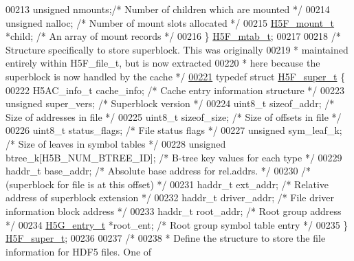 \begin{DoxyCode}
00213     \textcolor{keywordtype}{unsigned}        nmounts;\textcolor{comment}{/* Number of children which are mounted */}
00214     \textcolor{keywordtype}{unsigned}        nalloc; \textcolor{comment}{/* Number of mount slots allocated  */}
00215     \hyperlink{struct_h5_f__mount__t}{H5F\_mount\_t}      *child; \textcolor{comment}{/* An array of mount records        */}
00216 \} \hyperlink{struct_h5_f__mtab__t}{H5F\_mtab\_t};
00217 
00218 \textcolor{comment}{/* Structure specifically to store superblock. This was originally}
00219 \textcolor{comment}{ * maintained entirely within H5F\_file\_t, but is now extracted}
00220 \textcolor{comment}{ * here because the superblock is now handled by the cache */}
\hyperlink{struct_h5_f__super__t}{00221} \textcolor{keyword}{typedef} \textcolor{keyword}{struct }\hyperlink{struct_h5_f__super__t}{H5F\_super\_t} \{
00222     H5AC\_info\_t cache\_info;     \textcolor{comment}{/* Cache entry information structure          */}
00223     \textcolor{keywordtype}{unsigned}    super\_vers;     \textcolor{comment}{/* Superblock version                         */}
00224     uint8\_t sizeof\_addr;    \textcolor{comment}{/* Size of addresses in file                  */}
00225     uint8\_t sizeof\_size;    \textcolor{comment}{/* Size of offsets in file                    */}
00226     uint8\_t     status\_flags;   \textcolor{comment}{/* File status flags                          */}
00227     \textcolor{keywordtype}{unsigned}    sym\_leaf\_k;     \textcolor{comment}{/* Size of leaves in symbol tables            */}
00228     \textcolor{keywordtype}{unsigned}    btree\_k[H5B\_NUM\_BTREE\_ID]; \textcolor{comment}{/* B-tree key values for each type */}
00229     haddr\_t     base\_addr;      \textcolor{comment}{/* Absolute base address for rel.addrs.       */}
00230                                 \textcolor{comment}{/* (superblock for file is at this offset)    */}
00231     haddr\_t     ext\_addr;       \textcolor{comment}{/* Relative address of superblock extension   */}
00232     haddr\_t     driver\_addr;    \textcolor{comment}{/* File driver information block address      */}
00233     haddr\_t     root\_addr;      \textcolor{comment}{/* Root group address                         */}
00234     \hyperlink{struct_h5_g__entry__t}{H5G\_entry\_t} *root\_ent;      \textcolor{comment}{/* Root group symbol table entry              */}
00235 \} \hyperlink{struct_h5_f__super__t}{H5F\_super\_t};
00236 
00237 \textcolor{comment}{/*}
00238 \textcolor{comment}{ * Define the structure to store the file information for HDF5 files. One of}

\end{DoxyCode}

